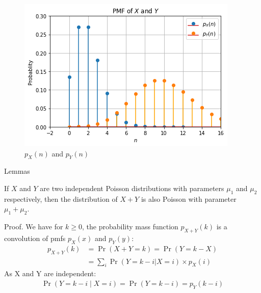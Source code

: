 \documentclass{beamer}
\providecommand{\pr}[1]{\ensuremath{\Pr\left(#1\right)}}
\begin{document}
\begin{frame}{}
\begin{figure}[h!]
    \centering
      \includegraphics[width=0.85\columnwidth]{Figures/pmf_X_and_Y.png}
     \caption{$p_X(n)$ and $p_Y(n)$}
\end{figure}
    \end{frame}
\begin{frame}{Lemmas}
    \begin{lemma}[1]\label{lemma_X+Y}
        \vspace{-2mm}
        If $X$ and $Y$ are two independent Poisson distributions with parameters $\mu_1$ and $\mu_2$ respectively, then the distribution of $X+Y$ is also Poisson with parameter $\mu_1 + \mu_2$. 
    \end{lemma}
    \begin{block}{Proof.}
         We have for $k \geq 0$, the probability mass function $p_{X+Y}(k)$ is a convolution of pmfs $p_X(x)$ and $p_Y(y)$: \vspace{-2mm}
    \begin{align}
       p_{X+Y}(k) &= \pr{X+ Y = k} = \pr{Y = k - X}\\
       &= \sum_{i}\pr{Y = k - i| X=i}\times p_X(i)\label{p_(x+y)}
    \end{align}\vspace{-2mm}
    As X and Y are independent: \vspace{-1mm}
    \begin{align}
        \pr{Y\! =\! k - i \mid X=i} = \pr{Y\! = \! k - i} = p_Y(k-i)
    \end{align}\\\vspace{-3mm}
    \end{block}
\end{frame}
\end{document}

